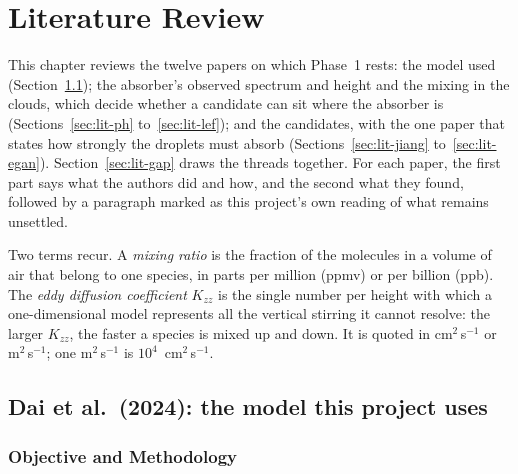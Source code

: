 
\chapter{Literature Review}
\label{ch:lit}

This chapter reviews the twelve papers on which Phase~1 rests: the model used
(Section~\ref{sec:lit-dai}); the absorber's observed spectrum and height and the mixing
in the clouds, which decide whether a candidate can sit where the absorber is
(Sections~\ref{sec:lit-ph} to~\ref{sec:lit-lef}); and the candidates, with the one paper
that states how strongly the droplets must absorb (Sections~\ref{sec:lit-jiang}
to~\ref{sec:lit-egan}). Section~\ref{sec:lit-gap} draws the threads together. For each
paper, the first part says what the authors did and how, and the second what they found,
followed by a paragraph marked as this project's own reading of what remains unsettled.

Two terms recur. A \emph{mixing ratio} is the fraction of the molecules in a volume of
air that belong to one species, in parts per million (ppmv) or per billion (ppb). The
\emph{eddy diffusion coefficient} $K_{zz}$ is the single number per height with which a
one-dimensional model represents all the vertical stirring it cannot resolve: the larger
$K_{zz}$, the faster a species is mixed up and down. It is quoted in cm$^{2}$\,s$^{-1}$
or m$^{2}$\,s$^{-1}$; one m$^{2}$\,s$^{-1}$ is $10^{4}$~cm$^{2}$\,s$^{-1}$.

\section{Dai et al.\ (2024): the model this project uses}
\label{sec:lit-dai}

\subsection{Objective and Methodology}

